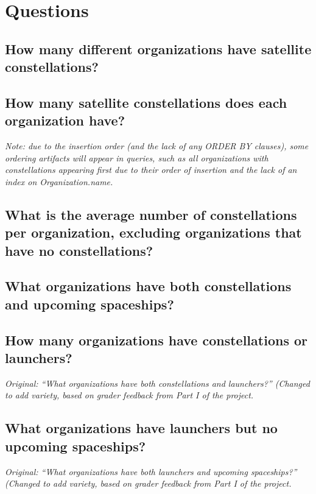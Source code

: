 \documentclass{article}
\begin{document}
\section{Questions}

    \subsection{How many different organizations have satellite constellations?}
    
    \subsection{How many satellite constellations does each organization have?}
    \textit{Note: due to the insertion order (and the lack of any ORDER BY clauses), some ordering artifacts will appear in queries, such as all organizations with constellations appearing first due to their order of insertion and the lack of an index on Organization.name.}
    
    \subsection{What is the average number of constellations per organization, excluding organizations that have no constellations?}
    
    \subsection{What organizations have both constellations and upcoming spaceships?}
    
    \subsection{How many organizations have constellations or launchers?}
    \textit{Original: ``What organizations have both constellations and launchers?'' (Changed to add variety, based on grader feedback from Part I of the project.}
    
    
    \subsection{What organizations have launchers but no upcoming spaceships?}
    \textit{Original: ``What organizations have both launchers and upcoming spaceships?'' (Changed to add variety, based on grader feedback from Part I of the project.}
    
\end{document}
